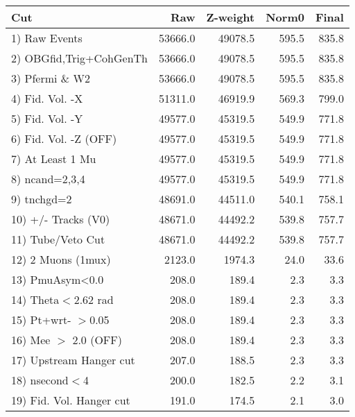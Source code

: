  \begin{table}[h!]\centering
 \begin{tabular}{||l||r|r|r|r||}
 \hline
 \hline
 Cut & Raw & Z-weight & Norm0 & Final \\
 \hline
  1) Raw Events           &     53666.0 &     49078.5 &       595.5 &       835.8 \\
  2) OBGfid,Trig+CohGenTh &     53666.0 &     49078.5 &       595.5 &       835.8 \\
  3) Pfermi \& W2         &     53666.0 &     49078.5 &       595.5 &       835.8 \\
  4) Fid. Vol. -X         &     51311.0 &     46919.9 &       569.3 &       799.0 \\
  5) Fid. Vol. -Y         &     49577.0 &     45319.5 &       549.9 &       771.8 \\
  6) Fid. Vol. -Z (OFF)   &     49577.0 &     45319.5 &       549.9 &       771.8 \\
  7) At Least 1 Mu        &     49577.0 &     45319.5 &       549.9 &       771.8 \\
  8) ncand=2,3,4          &     49577.0 &     45319.5 &       549.9 &       771.8 \\
  9) tnchgd=2             &     48691.0 &     44511.0 &       540.1 &       758.1 \\
 10) +/- Tracks (V0)      &     48671.0 &     44492.2 &       539.8 &       757.7 \\
 11) Tube/Veto Cut        &     48671.0 &     44492.2 &       539.8 &       757.7 \\
 12) 2 Muons (1mux)       &      2123.0 &      1974.3 &        24.0 &        33.6 \\
 13) PmuAsym<0.0          &       208.0 &       189.4 &         2.3 &         3.3 \\
 14) Theta$<$2.62 rad     &       208.0 &       189.4 &         2.3 &         3.3 \\
 15) Pt+wrt- $>$0.05      &       208.0 &       189.4 &         2.3 &         3.3 \\
 16) Mee $>$ 2.0  (OFF)   &       208.0 &       189.4 &         2.3 &         3.3 \\
 17) Upstream Hanger cut  &       207.0 &       188.5 &         2.3 &         3.3 \\
 18) nsecond$<$4          &       200.0 &       182.5 &         2.2 &         3.1 \\
 19) Fid. Vol. Hanger cut &       191.0 &       174.5 &         2.1 &         3.0 \\

\end{tabular}
\end{table}
